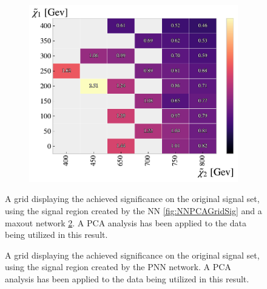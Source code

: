 \begin{figure}
{\begin{subfigure}{.5\textwidth}
        \includegraphics[width=\textwidth]{Figures/MLResults/NN/SUSY/Grid/MaxOutPCAGridSig.pdf}
        \caption{}
        \label{fig:MaxOutPCAGridSig}
    \end{subfigure}
    }
    \caption{A grid displaying the achieved significance on the original signal set, using the signal region 
    created by the \ac{NN} \ref{fig:NNPCAGridSig} and a maxout network \ref{fig:MaxOutPCAGridSig}. A \ac{PCA} 
    analysis has been applied to the data being utilized in this result.}
\end{figure}

\begin{figure}
    \caption{A grid displaying the achieved significance on the original signal set, using the signal region 
    created by the \ac{PNN} network. A \ac{PCA} analysis has been applied to the data being utilized in this result.}
    \label{fig:PNNPCAGridSig}
\end{figure}